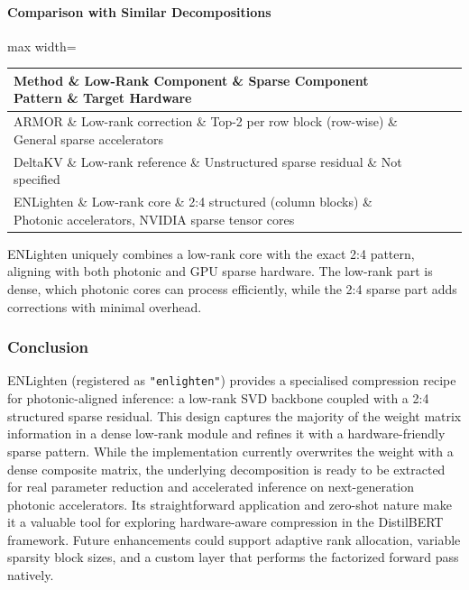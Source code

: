 \paragraph{Comparison with Similar Decompositions}

\begin{center}
\begin{adjustbox}{max width=\columnwidth}
\renewcommand{\arraystretch}{1.2}
\begin{tabular}{llll}
\toprule
Method \& Low-Rank Component \& Sparse Component Pattern \& Target Hardware \\
\midrule
ARMOR \& Low-rank correction \& Top-2 per row block (row-wise) \& General sparse accelerators \\
DeltaKV \& Low-rank reference \& Unstructured sparse residual \& Not specified \\
ENLighten \& Low-rank core \& 2:4 structured (column blocks) \& Photonic accelerators, NVIDIA sparse tensor cores \\

\bottomrule
\end{tabular}
\end{adjustbox}
\end{center}
ENLighten uniquely combines a low-rank core with the exact 2:4 pattern, aligning with both photonic and GPU sparse hardware. The low-rank part is dense, which photonic cores can process efficiently, while the 2:4 sparse part adds corrections with minimal overhead.


\subsubsection*{Conclusion}

ENLighten (registered as \texttt{"enlighten"}) provides a specialised compression recipe for photonic-aligned inference: a low-rank SVD backbone coupled with a 2:4 structured sparse residual. This design captures the majority of the weight matrix information in a dense low-rank module and refines it with a hardware-friendly sparse pattern. While the implementation currently overwrites the weight with a dense composite matrix, the underlying decomposition is ready to be extracted for real parameter reduction and accelerated inference on next-generation photonic accelerators. Its straightforward application and zero-shot nature make it a valuable tool for exploring hardware-aware compression in the DistilBERT framework. Future enhancements could support adaptive rank allocation, variable sparsity block sizes, and a custom layer that performs the factorized forward pass natively.

